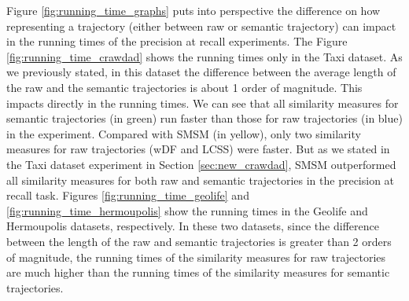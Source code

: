 Figure \ref{fig:running_time_graphs} puts into perspective the difference on how representing a trajectory (either between raw or semantic trajectory) can impact in the running times of the precision at recall experiments. The Figure \ref{fig:running_time_crawdad} shows the running times only in the Taxi dataset. As we previously stated, in this dataset the difference between the average length of the raw and the semantic trajectories is about 1 order of magnitude. This impacts directly in the running times. We can see that all similarity measures for semantic trajectories (in green) run faster than those for raw trajectories (in blue) in the experiment. Compared with SMSM (in yellow), only two similarity measures for raw trajectories (wDF and LCSS) were faster. But as we stated in the Taxi dataset experiment in Section \ref{sec:new_crawdad}, SMSM outperformed all similarity measures for both raw and semantic trajectories in the precision at recall task.
Figures \ref{fig:running_time_geolife} and \ref{fig:running_time_hermoupolis} show the running times in the Geolife and Hermoupolis datasets, respectively. In these two datasets, since the difference between the length of the raw and semantic trajectories is greater than 2 orders of magnitude, the running times of the similarity measures for raw trajectories are much higher than the running times of the similarity measures for semantic trajectories.

